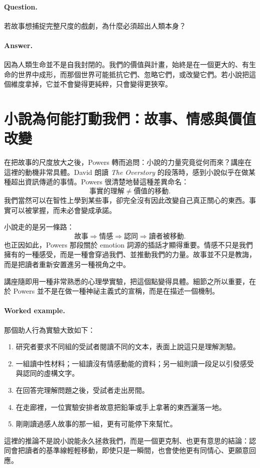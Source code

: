 \paragraph{Question.} 若故事想捕捉完整尺度的戲劇，為什麼必須超出人類本身？

\paragraph{Answer.} 因為人類生命並不是自我封閉的。我們的價值與計畫，始終是在一個更大的、有生命的世界中成形，而那個世界可能抵抗它們、忽略它們，或改變它們。若小說把這個維度拿掉，它並不會變得更純粹，只會變得更狹窄。

\section{小說為何能打動我們：故事、情感與價值改變}

在把故事的尺度放大之後，Powers 轉而追問：小說的力量究竟從何而來？講座在這裡的動機非常具體。David 朗讀 \emph{The Overstory} 的段落時，感到小說似乎在做某種超出資訊傳遞的事情。Powers 很清楚地替這種差異命名：
\begin{equation}
\text{事實的理解} \neq \text{價值的移動}.
\end{equation}
我們當然可以在智性上學到某些事，卻完全沒有因此改變自己真正關心的東西。事實可以被掌握，而未必會變成承諾。

小說走的是另一條路：
\begin{equation}
\text{故事} \Rightarrow \text{情感} \Rightarrow \text{認同} \Rightarrow \text{讀者被移動}.
\end{equation}
也正因如此，Powers 那段關於 emotion 詞源的插話才顯得重要。情感不只是我們擁有的一種感受，而是一種會穿過我們、並推動我們的力量。故事並不只是教誨，而是把讀者重新安置進另一種視角之中。

講座隨即用一種非常熟悉的心理學實驗，把這個點變得具體。細節之所以重要，在於 Powers 並不是在做一種神祕主義式的宣稱，而是在描述一個機制。

\paragraph{Worked example.} 那個助人行為實驗大致如下：
\begin{enumerate}
\item 研究者要求不同組的受試者閱讀不同的文本，表面上說這只是理解測驗。
\item 一組讀中性材料；一組讀沒有情感動能的資料；另一組則讀一段足以引發感受與認同的虛構文字。
\item 在回答完理解問題之後，受試者走出房間。
\item 在走廊裡，一位實驗安排者故意把鉛筆或手上拿著的東西灑落一地。
\item 剛剛讀過感人故事的那一組，更有可能停下來幫忙。
\end{enumerate}
這裡的推論不是說小說能永久拯救我們，而是一個更克制、也更有意思的結論：認同會把讀者的基準線輕輕移動，即使只是一瞬間，也會使他更有同情心、更願意回應。

